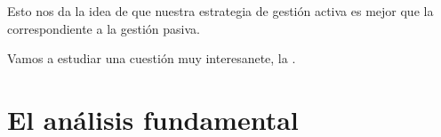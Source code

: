 Esto nos da la idea de que nuestra estrategia de gestión activa es mejor que la correspondiente a la gestión pasiva.

Vamos a estudiar una cuestión muy interesanete, la .



\section{El análisis fundamental}
